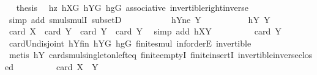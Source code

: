 \begin{isabellebody}
\ \isamarkupfalse%
\ {\isacharquery}{\kern0pt}thesis\ \isamarkupfalse%
\ hz\ hXG\ hYG\ hgG\ associative\ invertible{\isacharunderscore}{\kern0pt}right{\isacharunderscore}{\kern0pt}inverse{}\isanewline
\ \ \ \ \ \ \ \ \isamarkupfalse%
\ {\isacharparenleft}{\kern0pt}simp\ add{\isacharcolon}{\kern0pt}\ smul{\isachardot}{\kern0pt}smulI\ subsetD{\isacharparenright}{\kern0pt}\isanewline
\ \ \ \ \isamarkupfalse%
\isanewline
\ \ \isamarkupfalse%
\isanewline
\ \ \isamarkupfalse%
\ hY{}ne{\isacharcolon}{\kern0pt}\ {\isachardoublequoteopen}{\isacharquery}{\kern0pt}Y{}\ {\isasymnoteq}\ {\isacharbraceleft}{\kern0pt}{\isacharbraceright}{\kern0pt}{\isachardoublequoteclose}\isanewline
\ \ \isamarkupfalse%
\isanewline
\ \ \ \ \isamarkupfalse%
\ hY{}{\isacharcolon}{\kern0pt}\ {\isachardoublequoteopen}{\isacharquery}{\kern0pt}Y{}\ {\isacharequal}{\kern0pt}\ {\isacharbraceleft}{\kern0pt}{\isacharbraceright}{\kern0pt}{\isachardoublequoteclose}\isanewline
\ \ \ \ \isamarkupfalse%
\ {\isachardoublequoteopen}card\ X\ {\isacharplus}{\kern0pt}\ card\ Y\ {\isasymle}\ card\ Y\ {\isacharplus}{\kern0pt}\ card\ Y{\isachardoublequoteclose}\ \isamarkupfalse%
\ {\isacharparenleft}{\kern0pt}simp\ add{\isacharcolon}{\kern0pt}\ hXY{\isacharparenright}{\kern0pt}\isanewline
\ \ \ \ \isamarkupfalse%
\ \isamarkupfalse%
\ {\isachardoublequoteopen}{\isachardot}{\kern0pt}{\isachardot}{\kern0pt}{\isachardot}{\kern0pt}\ {\isacharequal}{\kern0pt}\ card\ {\isacharquery}{\kern0pt}Y{}{\isachardoublequoteclose}\ \isamarkupfalse%
\ card{\isacharunderscore}{\kern0pt}Un{\isacharunderscore}{\kern0pt}disjoint\ hYfin\ hYG\ hgG\ finite{\isacharunderscore}{\kern0pt}smul\ inf{\isachardot}{\kern0pt}orderE\ invertible\isanewline
\ \ \ \ \ \ \isamarkupfalse%
\ {\isacharparenleft}{\kern0pt}metis\ hY{}\ card{\isacharunderscore}{\kern0pt}smul{\isacharunderscore}{\kern0pt}singleton{\isacharunderscore}{\kern0pt}left{\isacharunderscore}{\kern0pt}eq\ finite{\isachardot}{\kern0pt}emptyI\ finite{\isachardot}{\kern0pt}insertI\ invertible{\isacharunderscore}{\kern0pt}inverse{\isacharunderscore}{\kern0pt}closed{\isacharparenright}{\kern0pt}\isanewline
\ \ \ \ \isamarkupfalse%
\ \isamarkupfalse%
\ {\isachardoublequoteopen}{\isachardot}{\kern0pt}{\isachardot}{\kern0pt}{\isachardot}{\kern0pt}\ {\isasymle}\ card\ {\isacharparenleft}{\kern0pt}{\isacharquery}{\kern0pt}X{}\ {\isasymcdots}\ {\isacharquery}{\kern0pt}Y{}{\isacharparenright}{\kern0pt}{\isachardoublequoteclose}\ \isamarkupfalse%

\end{isabellebody}
